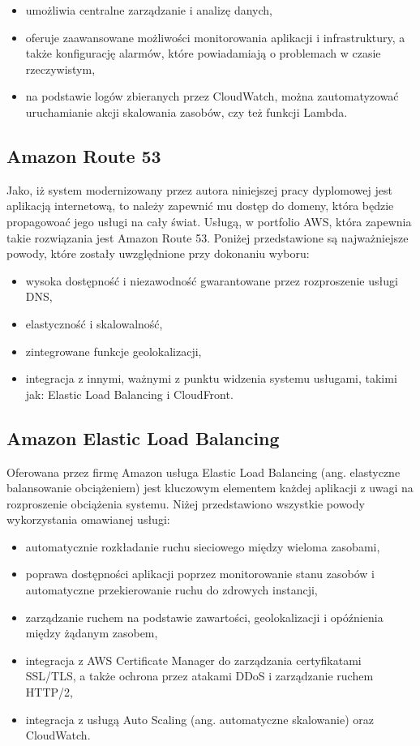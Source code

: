 \documentclass[12pt,twoside]{book}
\begin{document}
\begin{itemize}
\item umożliwia centralne zarządzanie i analizę danych,
\item oferuje zaawansowane możliwości monitorowania aplikacji i infrastruktury, a także konfigurację alarmów, które powiadamiają o problemach w czasie rzeczywistym,
\item na podstawie logów zbieranych przez CloudWatch, można zautomatyzować uruchamianie akcji skalowania zasobów, czy też funkcji Lambda. \cite{aws.cloud.watch}
\end{itemize}

\subsection{Amazon Route 53}
Jako, iż system modernizowany przez autora niniejszej pracy dyplomowej jest aplikacją internetową, to należy zapewnić mu dostęp do domeny, która będzie propagowoać jego usługi na cały świat. Usługą, w portfolio AWS, która zapewnia takie rozwiązania jest Amazon Route 53. Poniżej przedstawione są najważniejsze powody, które zostały uwzględnione przy dokonaniu wyboru:

\begin{itemize}
\item wysoka dostępność i niezawodność gwarantowane przez rozproszenie usługi DNS,
\item elastyczność i skalowalność,
\item zintegrowane funkcje geolokalizacji,
\item integracja z innymi, ważnymi z punktu widzenia systemu usługami, takimi jak: Elastic Load Balancing i CloudFront. \cite{aws.route53}
\end{itemize}

\subsection{Amazon Elastic Load Balancing}
Oferowana przez firmę Amazon usługa Elastic Load Balancing (ang. elastyczne balansowanie obciążeniem) jest kluczowym elementem każdej aplikacji z uwagi na rozproszenie obciążenia systemu. Niżej przedstawiono wszystkie powody wykorzystania omawianej usługi:

\begin{itemize}
\item automatycznie rozkładanie ruchu sieciowego między wieloma zasobami,
\item poprawa dostępności aplikacji poprzez monitorowanie stanu zasobów i automatyczne przekierowanie ruchu do zdrowych instancji,
\item zarządzanie ruchem na podstawie zawartości, geolokalizacji i opóźnienia między żądanym zasobem,
\item integracja z AWS Certificate Manager do zarządzania certyfikatami SSL/TLS, a także ochrona przez atakami DDoS i zarządzanie ruchem HTTP/2,
\item integracja z usługą Auto Scaling (ang. automatyczne skalowanie) oraz CloudWatch. \cite{aws.elb}
\end{itemize}
\end{document}

